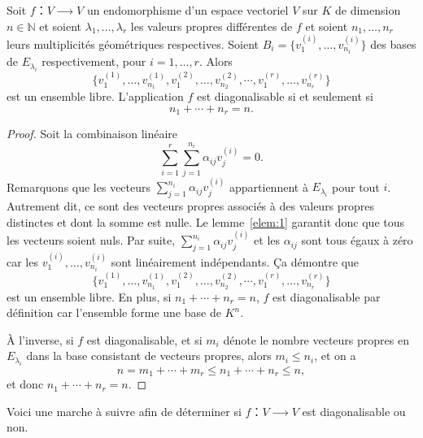 \begin{corollary}
  \label{eco:1}
   Soit $f ：V ⟶V$ un endomorphisme d'un espace vectoriel $V$ sur $K$ de dimension $n ∈ ℕ$ et soient $λ_1,\dots,λ_r$
  les valeurs propres différentes de $f$
  et soient $n_1,\dots,n_r$
  leurs multiplicités géométriques respectives. Soient
  $B_i= \{v_1^{(i)},\dots,v_{n_i}^{(i)}\}$
  des bases de $E_{λ_i}$ 
  respectivement, pour $i=1,\dots,r$. Alors
  \begin{displaymath}
    \{ v_1^{(1)},\dots,v_{n_1}^{(1)},v_1^{(2)},\dots,v_{n_2}^{(2)},\cdots,v_1^{(r)},\dots,v_{n_r}^{(r)} \}
  \end{displaymath}
est un ensemble libre. L'application $f$ est diagonalisable si et seulement si
\begin{displaymath}
  n_1 + \cdots + n_r =n.
\end{displaymath}
\end{corollary}
\begin{proof}
  Soit la combinaison linéaire 
  \begin{displaymath}
    ∑_{i=1}^r ∑_{j=1}^{n_i} α_{ij} v^{(i)}_j = 0.
  \end{displaymath}
  Remarquons que les vecteurs $ ∑_{j=1}^{n_i} α_{ij} v^{(i)}_j $ appartiennent à $E_{\lambda_i}$ pour tout $i$. Autrement dit, ce sont des vecteurs propres associés à des valeurs propres distinctes et dont la somme est nulle. Le lemme~\ref{elem:1} garantit donc que tous les vecteurs soient nuls. Par suite, $ ∑_{j=1}^{n_i} α_{ij} v^{(i)}_j $ et les $α_{ij}$ sont tous égaux à zéro car les $v_1^{(i)},\dots,v_{n_i}^{(i)}$ sont linéairement indépendants. Ça démontre que
   \begin{displaymath}
    \{ v_1^{(1)},\dots,v_{n_1}^{(1)},v_1^{(2)},\dots,v_{n_2}^{(2)},\cdots,v_1^{(r)},\dots,v_{n_r}^{(r)} \}	
  \end{displaymath} est un ensemble libre. En plus, si $n_1+\cdots+n_r=n$, $f$ est diagonalisable par définition car l'ensemble forme une base de $K^n$.

  À l'inverse, si $f$ est diagonalisable, et si $m_i$ dénote le nombre vecteurs propres en $E_{λ_i}$ dans la base consistant de vecteurs propres, alors $m_i ≤ n_i$, et on a
  \begin{displaymath}
    n = m_1 + \cdots + m_r ≤ n_1+ \cdots + n_r ≤n,
  \end{displaymath}
  et donc $n_1+\cdots + n_r =n$.
\end{proof}




Voici une marche à suivre afin de déterminer si $f：V ⟶V$ est diagonalisable ou non.

